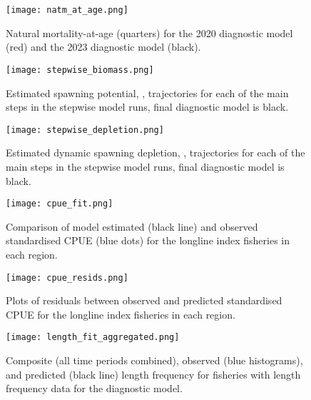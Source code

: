 \newpage
\begin{figure}[!ht]
  \centering
  \texttt{[image: natm\_at\_age.png]}
  \caption{Natural mortality-at-age (quarters) for the 2020 diagnostic model (red) and the 2023 diagnostic model (black). \label{fig:natm_at_age}}
\end{figure}
\clearpage

\newpage
\begin{landscape}
  \begin{figure}[!ht]
    \centering
    \texttt{[image: stepwise\_biomass.png]}
    \caption{Estimated spawning potential, \sbt, trajectories for each of the main steps in the stepwise model runs, final diagnostic model is black. \label{fig:stepwise_biomass}}
  \end{figure}
\end{landscape}
\clearpage

\newpage
\begin{landscape}
  \begin{figure}[!ht]
    \centering
    \texttt{[image: stepwise\_depletion.png]}
    \caption{Estimated dynamic spawning depletion, \sbtsbfo, trajectories for each of the main steps in the stepwise model runs, final diagnostic model is black. \label{fig:stepwise_depletion}}
  \end{figure}
\end{landscape}
\clearpage

\newpage
\begin{figure}[!ht]
  \centering
  \texttt{[image: cpue\_fit.png]}
  \caption{Comparison of model estimated (black line) and observed standardised CPUE (blue dots) for the longline index fisheries in each region. \label{fig:cpue_fit}}
\end{figure}
\clearpage

\newpage
\begin{figure}[!ht]
  \centering
  \texttt{[image: cpue\_resids.png]}
  \caption{Plots of residuals between observed and predicted standardised CPUE for the longline index fisheries in each region.  \label{fig:cpue_resids}}
\end{figure}
\clearpage

\newpage
\begin{figure}[!ht]
  \centering
  \texttt{[image: length\_fit\_aggregated.png]}
  \caption{Composite (all time periods combined), observed (blue histograms), and predicted (black line) length frequency for fisheries with length frequency data for the diagnostic model. \label{fig:length_fit_aggregated}}
\end{figure}
\clearpage

